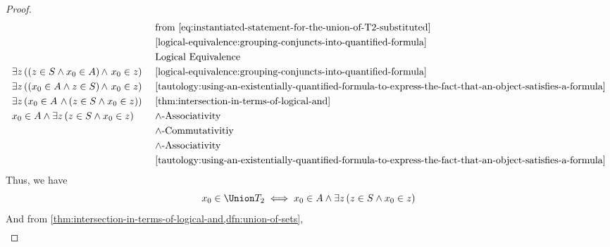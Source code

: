 \begin{proof}
\begin{equation*}
\begin{aligned}
            &\exists z \, \mleft( \mleft( z \in S \land x_{0} \in A \mright) \,{\land}\,\, x_{0} \in z \mright)\\
            &\exists z \, \mleft( \mleft( x_{0} \in A \land z \in S \mright) \,{\land}\,\, x_{0} \in z \mright)\\
            &\exists z \, \mleft( x_{0} \in A \,\,{\land}\, \mleft( z \in S \land x_{0} \in z \mright)\mright)\\
            &x_{0} \in A \land \exists z \, \mleft( z \in S \land x_{0} \in z \mright)\\
        \end{aligned}
        \text{  }
        \begin{aligned}
            &\quad \text{from \eqref{eq:instantiated-statement-for-the-union-of-T2-substituted}}\\
            &\quad \text{\cref{logical-equivalence:grouping-conjuncts-into-quantified-formula}}\\
            &\quad \text{Logical Equivalence}\\
            &\quad \text{\cref{logical-equivalence:grouping-conjuncts-into-quantified-formula}}\\
            &\quad \text{\cref{tautology:using-an-existentially-quantified-formula-to-express-the-fact-that-an-object-satisfies-a-formula}}\\
            &\quad \text{\cref{thm:intersection-in-terms-of-logical-and}}\\
            &\quad \text{\( \land \)-Associativity}\\
            &\quad \text{\( \land \)-Commutativitiy}\\
            &\quad \text{\( \land \)-Associativity}\\
            &\quad \text{\cref{tautology:using-an-existentially-quantified-formula-to-express-the-fact-that-an-object-satisfies-a-formula}}\\
        \end{aligned}
    \end{equation*}
    Thus, we have
    \begin{equation}
        \label{eq:final-statement-for-the-union-of-T2}
        x_{0} \in \Union T_{2}
        \iff
        x_{0} \in A \land \exists z \, \mleft( z \in S \land x_{0} \in z \mright)
    \end{equation}
    And from \cref{thm:intersection-in-terms-of-logical-and,dfn:union-of-sets},
    \begin{align}
        \label{eq:final-statement-of-A-intersect-union-S}

\end{align}
\end{proof}
